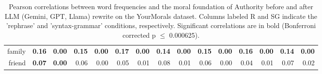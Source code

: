 \begin{table}[hbtp]
{\begin{tabular}{rrr|rrrrrr|rrrrrr}
  family & \bf{0.16} & \bf{0.00} & \bf{0.15} & \bf{0.00} & \bf{0.17} & \bf{0.00} & \bf{0.14} & \bf{0.00} & \bf{0.15} & \bf{0.00} & \bf{0.16} & \bf{0.00} & \bf{0.14} & \bf{0.00} \\ 
  friend & \bf{0.07} & \bf{0.00} & 0.06 & 0.00 & 0.05 & 0.01 & 0.08 & 0.01 & 0.06 & 0.00 & 0.04 & 0.01 & 0.07 & 0.02 \\ 
   \hline
\end{tabular}}
\caption{Pearson correlations between word frequencies and the moral foundation of Authority before and after LLM (Gemini, GPT, Llama) rewrite on the YourMorals dataset. Columns labeled R and SG indicate the ’rephrase’ and ’syntax-grammar’
conditions, respectively. Significant correlations are in bold (Bonferroni corrected p $\leq$ 0.000625).} 
\end{table}